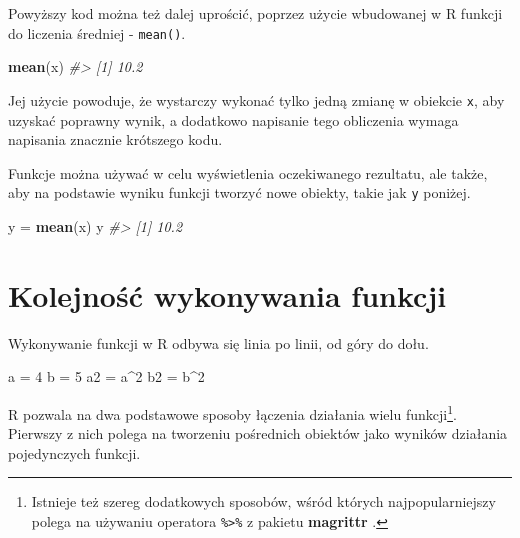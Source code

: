 \documentclass[paper=6in:9in,pagesize=pdftex,headinclude=on,footinclude=on,10pt]{scrbook}
\newenvironment{Shaded}{\begin{snugshade}}{\end{snugshade}}
\newcommand{\CommentTok}[1]{\textcolor[rgb]{0.56,0.35,0.01}{\textit{#1}}}
\newcommand{\DecValTok}[1]{\textcolor[rgb]{0.00,0.00,0.81}{#1}}
\newcommand{\KeywordTok}[1]{\textcolor[rgb]{0.13,0.29,0.53}{\textbf{#1}}}
\newcommand{\NormalTok}[1]{#1}
\newcommand{\OperatorTok}[1]{\textcolor[rgb]{0.81,0.36,0.00}{\textbf{#1}}}
\newcommand{\StringTok}[1]{\textcolor[rgb]{0.31,0.60,0.02}{#1}}
\begin{document}
Powyższy kod można też dalej uprościć, poprzez użycie wbudowanej w R funkcji do liczenia średniej - \texttt{mean()}.

\begin{Shaded}
\begin{Highlighting}[]
\KeywordTok{mean}\NormalTok{(x)}
\CommentTok{#> [1] 10.2}
\end{Highlighting}
\end{Shaded}

Jej użycie powoduje, że wystarczy wykonać tylko jedną zmianę w obiekcie \texttt{x}, aby uzyskać poprawny wynik, a dodatkowo napisanie tego obliczenia wymaga napisania znacznie krótszego kodu.

Funkcje można używać w celu wyświetlenia oczekiwanego rezultatu, ale także, aby na podstawie wyniku funkcji tworzyć nowe obiekty, takie jak \texttt{y} poniżej.

\begin{Shaded}
\begin{Highlighting}[]
\NormalTok{y =}\StringTok{ }\KeywordTok{mean}\NormalTok{(x)}
\NormalTok{y}
\CommentTok{#> [1] 10.2}
\end{Highlighting}
\end{Shaded}

\hypertarget{kolejnosc-funkcji}{%
\section{Kolejność wykonywania funkcji}\label{kolejnosc-funkcji}}

Wykonywanie funkcji w R odbywa się linia po linii, od góry do dołu.

\begin{Shaded}
\begin{Highlighting}[]
\NormalTok{a =}\StringTok{ }\DecValTok{4}
\NormalTok{b =}\StringTok{ }\DecValTok{5}
\NormalTok{a2 =}\StringTok{ }\NormalTok{a}\OperatorTok{^}\DecValTok{2}
\NormalTok{b2 =}\StringTok{ }\NormalTok{b}\OperatorTok{^}\DecValTok{2}
\end{Highlighting}
\end{Shaded}

R pozwala na dwa podstawowe sposoby łączenia działania wielu funkcji\footnote{Istnieje też szereg dodatkowych sposobów, wśród których najpopularniejszy polega na używaniu operatora \texttt{\%\textgreater{}\%} z pakietu \textbf{magrittr} \citep{R-magrittr}.}.
Pierwszy z nich polega na tworzeniu pośrednich obiektów jako wyników działania pojedynczych funkcji.
\end{document}
